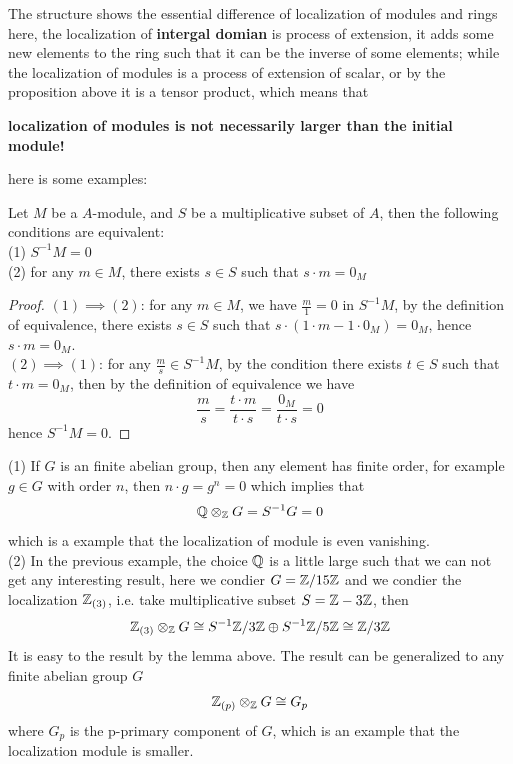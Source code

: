     The structure shows the essential difference of localization of modules and rings here, the localization of \textbf{intergal domian} is process of extension, it adds some new elements to the ring such that it can be the inverse of some elements; while the localization of modules is a process of extension of scalar, or by the proposition above it is a tensor product, which means that 
    \begin{center}
        \textbf{localization of modules is not necessarily larger than the initial module!}
    \end{center}
    here is some examples:




    
    \begin{lemma}
        Let \(M\) be a \(A\)-module, and \(S\) be a multiplicative subset of \(A\), then the following conditions are equivalent:\\
        (1) \(S^{-1}M = 0\)\\
        (2) for any \(m \in M\), there exists \(s \in S\) such that \(s \cdot m = 0_M\)

        \begin{proof}
            \((1) \implies (2)\): for any \(m \in M\), we have \(\frac{m}{1} = 0\) in \(S^{-1}M\), by the definition of equivalence, there exists \(s \in S\) such that \(s \cdot (1\cdot m - 1 \cdot 0_M) = 0_M\), hence \(s \cdot m = 0_M\).\\

            \((2) \implies (1)\): for any \(\frac{m}{s} \in S^{-1}M\), by the condition there exists \(t \in S\) such that \(t \cdot m = 0_M\), then by the definition of equivalence we have
            \[\frac{m}{s} = \frac{t \cdot m}{t \cdot s} = \frac{0_M}{t \cdot s} = 0\]
            hence \(S^{-1}M = 0\).
        \end{proof}
    \end{lemma}

    (1) If \(G\) is an finite abelian group, then any element has finite order, for example \(g \in G\) with order \(n\), then \(n\cdot g = g^n = 0\) which implies that 
    \[\mathbb{Q} \otimes_{\mathbb{Z}}G = S^{-1}G = 0\]
    which is a example that the localization of module is even vanishing.\\

    (2) In the previous example, the choice \(\mathbb{Q}\) is a little large such that we can not get any interesting result, here we condier \(G = \mathbb{Z}/15\mathbb{Z}\) and we condier the localization \(\mathbb{Z}_{(3)}\), i.e. take multiplicative subset \(S = \mathbb{Z} - 3\mathbb{Z}\), then
    \[\mathbb{Z}_{(3)} \otimes_{\mathbb{Z}} G \cong S^{-1}\mathbb{Z}/3\mathbb{Z} \oplus S^{-1}\mathbb{Z}/5\mathbb{Z} \cong \mathbb{Z}/3\mathbb{Z}\]
    It is easy to the result by the lemma above. The result can be generalized to any finite abelian group \(G\)
    \[\mathbb{Z}_{(p)} \otimes_{\mathbb{Z}} G \cong G_p\]
    where \(G_p\) is the p-primary component of \(G\), which is an example that the localization module is smaller.\\

